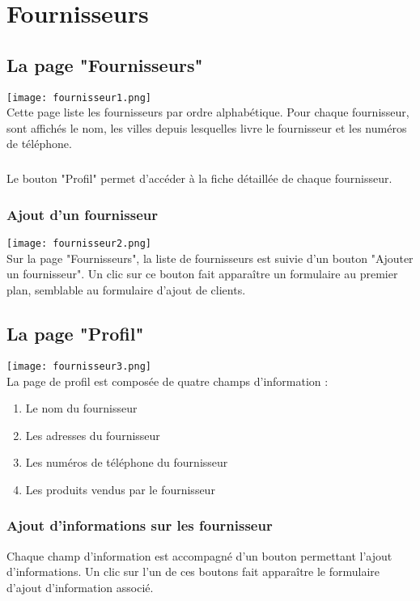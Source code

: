 \chapter{Fournisseurs}

\section{La page "Fournisseurs"}
\texttt{[image: fournisseur1.png]}\\
Cette page liste les fournisseurs par ordre alphabétique. Pour chaque fournisseur, sont
affichés le nom, les villes depuis lesquelles livre le fournisseur et
les numéros de téléphone.

\paragraph{}
Le bouton "Profil" permet d'accéder à la fiche détaillée de chaque fournisseur.

\subsection{Ajout d'un fournisseur}
\texttt{[image: fournisseur2.png]}\\
Sur la page "Fournisseurs", la liste de fournisseurs est suivie d'un bouton
"Ajouter un fournisseur". Un clic sur ce bouton fait apparaître un formulaire au
premier plan, semblable au formulaire d'ajout de clients.

\section{La page "Profil"}
\texttt{[image: fournisseur3.png]}\\
La page de profil est composée de quatre champs d'information :

\begin{enumerate}
  \item Le nom du fournisseur
  \item Les adresses du fournisseur
  \item Les numéros de téléphone du fournisseur
  \item Les produits vendus par le fournisseur
\end{enumerate}

\subsection{Ajout d'informations sur les fournisseur}
Chaque champ d'information est accompagné d'un bouton permettant l'ajout d'informations.
Un clic sur l'un de ces boutons fait apparaître le formulaire d'ajout
d'information associé.

